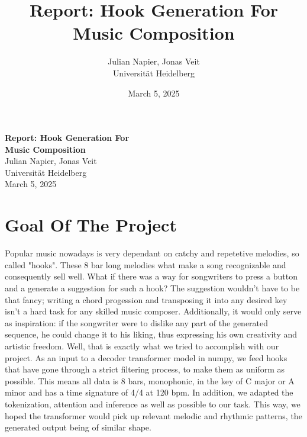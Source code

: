 \documentclass[a4paper,12pt]{extarticle}
\title{\textbf{\setstretch{1.5}Report: Hook Generation For Music Composition}}
\author{Julian Napier, Jonas Veit \\ Universität Heidelberg}
\date{March 5, 2025}
\begin{document}
\begin{titlepage}
    \thispagestyle{empty}  %
    \begin{center}
        \vspace*{\fill}  %
        {\Huge \textbf{Report: Hook Generation For \\ \vspace{0.2cm}Music Composition}}\\[1.5cm]
        {\Large Julian Napier, Jonas Veit}\\[0.5cm]
        {\Large Universität Heidelberg}\\[1.5cm]
        {\Large March 5, 2025}\\[1 cm]
        \vspace*{\fill}  %
    \end{center}
\end{titlepage}

\newpage

\tableofcontents
\newpage

\section{Goal Of The Project}
Popular music nowadays is very dependant on catchy and repetetive melodies, so called "hooks". These 8 bar long melodies what make a song recognizable and consequently sell well. What if there was a way for songwriters to press a button and a generate a suggestion for such a hook? The suggestion wouldn't have to be that fancy; writing a chord progession and transposing it into any desired key isn't a hard task for any skilled music composer. Additionally, it would only serve as inspiration: if the songwriter were to dislike any part of the generated sequence, he could change it to his liking, thus expressing his own creativity and artistic freedom.\vspace{0.1cm}
\newline Well, that is exactly what we tried to accomplish with our project. As an input to a decoder transformer model in numpy, we feed hooks that have gone through a strict filtering process, to make them as uniform as possible. This means all data is 8 bars, monophonic, in the key of C major or A minor and has a time signature of 4/4 at 120 bpm. In addition, we adapted the tokenization, attention and inference as well as possible to our task. This way, we hoped the transformer would pick up relevant melodic and rhythmic patterns, the generated output being of similar shape.
\end{document}
